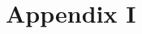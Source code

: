 \documentclass[letterpaper,12pt]{article}
\begin{document}
\section{Appendix I}


\begin{thebibliography}{99}


\end{thebibliography}
\end{document}
